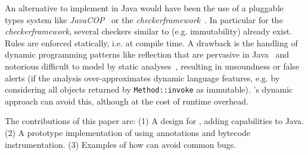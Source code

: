 An alternative to implement \dala in Java would have been the use of a pluggable types system like \textit{JavaCOP}~\cite{markstrum2010javacop} or the \textit{checkerframework}~\cite{ernst2010building}. In particular for the \textit{checkerframework}, several checkers similar to \dala (e.g. immutability) already exist. Rules are enforced statically, i.e. at compile time. 
A drawback is the handling of dynamic programming patterns like reflection that are pervasive in Java~\cite{sui2020recall} and notorious difficult to model by static analyses~\cite{ernst2003static,livshits2015defense}, resulting in unsoundness or false alerts (if the analysis over-approximates dynamic language features, e.g. by considering all objects returned by \texttt{Method::invoke} as immutable). \jdala's dynamic approach can avoid this, although at the cost of runtime overhead.

%
The contributions of this paper are: 
(1) A design for \jdala, adding \dala capabilities to Java.
(2) A prototype implementation of \jdala using annotations and bytecode instrumentation.
(3) Examples of how \jdala can avoid common bugs.
